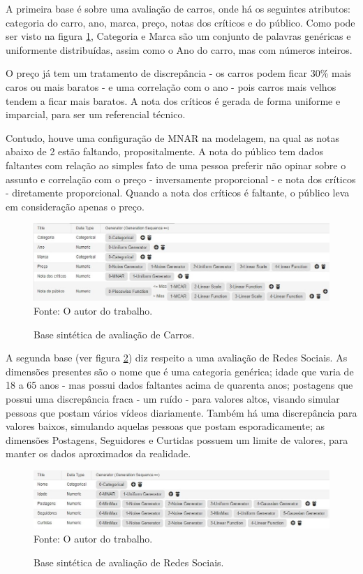 \documentclass[
	12pt,				%
	openright,			%
	oneside,			%
	a4paper,			%
	english,			%
	brazil				%
	]{abntex2}
\begin{document}
		A primeira base é sobre uma avaliação de carros, onde há os seguintes atributos: 
		categoria do carro,
		ano,
		marca,
		preço,
		notas dos críticos e do público.
		Como pode ser visto na figura \ref{fig:CarrosModelo}, Categoria e Marca são um conjunto de palavras genéricas e uniformente distribuídas, assim como o Ano do carro, mas com números inteiros.
		\par
		O preço já tem um tratamento de discrepância - os carros podem ficar 30\% mais caros ou mais baratos - e uma correlação com o ano - pois carros mais velhos tendem a ficar mais baratos.
		A nota dos críticos é gerada de forma uniforme e imparcial, para ser um referencial técnico.
		\par
		Contudo, houve uma configuração de MNAR na modelagem, na qual as notas abaixo de 2 estão faltando, propositalmente.
		A nota do público tem dados faltantes com relação ao simples fato de uma pessoa preferir não opinar sobre o assunto e correlação com o preço - inversamente proporcional - e nota dos críticos - diretamente proporcional.
		Quando a nota dos críticos é faltante, o público leva em consideração apenas o preço.
		\par
		\begin{figure}[h!]
			\centering
			\caption{Base sintética de avaliação de Carros.}
			\includegraphics[width=\linewidth]{./figures/Resultados/CarrosModelo.jpg}
			\label{fig:CarrosModelo}
			\footnotesize Fonte: O autor do trabalho.
		\end{figure}

		A segunda base (ver figura \ref{fig:RSmodelo}) diz respeito a uma avaliação de Redes Sociais.
		As dimensões presentes são
		 o nome que é uma categoria genérica;
		 idade que varia de 18 a 65 anos - mas possui dados faltantes acima de quarenta anos;
		 postagens que possui uma discrepância fraca - um ruído - para valores altos, visando simular pessoas que postam vários vídeos diariamente.
		 Também há uma discrepância para valores baixos, simulando aquelas pessoas que postam esporadicamente;
		 as dimensões Postagens, Seguidores e Curtidas possuem um limite de valores, para manter os dados aproximados da realidade.
		\par
		\begin{figure}[h!]
			\centering
			\caption{Base sintética de avaliação de Redes Sociais.}
			\includegraphics[width=\linewidth]{./figures/Resultados/RSmodelo.jpg}
			\label{fig:RSmodelo}
			\footnotesize Fonte: O autor do trabalho.
		\end{figure}
\end{document}
